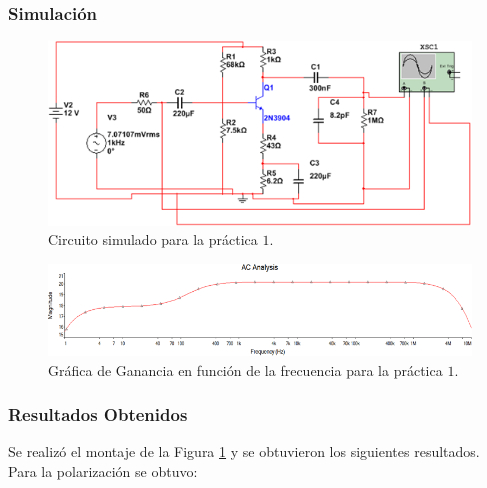 \documentclass[11pt,graphicx,caption,rotating]{article}
\begin{document}
\subsubsection{Simulación}
\noindent
\begin{figure}[H]
	\centering
		\includegraphics[scale=0.65]{circuit_lab_1b.png}
	\caption{Circuito simulado para la práctica $1$.}
	\label{fig4}
\end{figure}

\begin{figure}[H]
	\centering
		\includegraphics[scale=0.65]{simulation_lab_1b.png}
	\caption{Gráfica de Ganancia en función de la frecuencia para la práctica $1$.}
	\label{fig5}
\end{figure}

\subsubsection{Resultados Obtenidos}
\noindent
Se realizó el montaje de la Figura \ref{fig4} y se obtuvieron los siguientes resultados.\\
Para la polarización se obtuvo:
\end{document}
